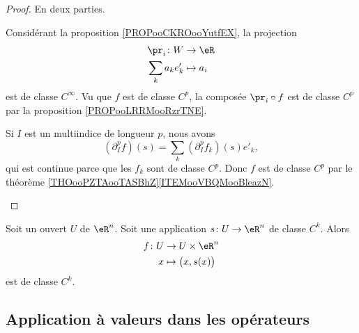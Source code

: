 \begin{proof}
	En deux parties.
	\begin{subproof}
		Considérant la proposition \ref{PROPooCKROooYutfEX}, la projection
		\begin{equation}
			\begin{aligned}
				\pr_i\colon W & \to \eR     \\
				\sum_ka_ke'_k & \mapsto a_i
			\end{aligned}
		\end{equation}
		est de classe \( C^{\infty}\). Vu que \( f\) est de classe \( C^p\), la composée \( \pr_i\circ f\) est de classe \( C^p\) par la proposition \ref{PROPooLRRMooRzrTNE}.

		Si \( I\) est un multiindice de longueur \( p\), nous avons
		\begin{equation}
			(\partial^p_If)(s)=\sum_k(\partial^p_If_k)(s)e'_k,
		\end{equation}
		qui est continue parce que les \( f_k\) sont de classe \( C^p\). Donc \( f\) est de classe \( C^p\) par le théorème \ref{THOooPZTAooTASBhZ}\ref{ITEMooVBQMooBleazN}.
	\end{subproof}
\end{proof}

\begin{proposition}	\label{PROPooWOYSooVERAAx}
	Soit un ouvert \( U\) de \( \eR^n\). Soit une application \(s \colon U\to \eR^n  \) de classe \( C^k\). Alors
	\begin{equation}
		\begin{aligned}
			f\colon U & \to U\times \eR^n          \\
			x         & \mapsto \big( x,s(x) \big)
		\end{aligned}
	\end{equation}
	est de classe \( C^k\).
\end{proposition}



\subsection{Application à valeurs dans les opérateurs}

